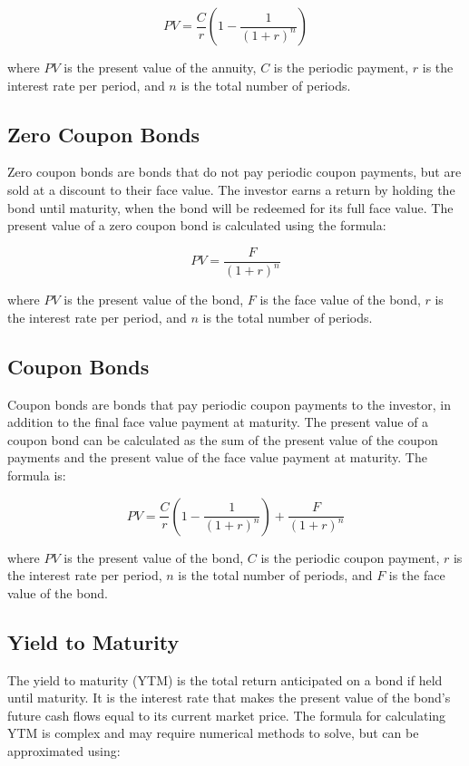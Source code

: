\documentclass{article}
\theoremstyle{mytheoremstyle}
\theoremstyle{mytheoremstyle}
\theoremstyle{myproblemstyle}
\begin{document}
\begin{equation}
PV = \frac{C}{r} \left( 1 - \frac{1}{(1+r)^n} \right)
\end{equation}

where $PV$ is the present value of the annuity, $C$ is the periodic payment, $r$ is the interest rate per period, and $n$ is the total number of periods.

\subsection{Zero Coupon Bonds}
Zero coupon bonds are bonds that do not pay periodic coupon payments, but are sold at a discount to their face value. The investor earns a return by holding the bond until maturity, when the bond will be redeemed for its full face value. The present value of a zero coupon bond is calculated using the formula:

\begin{equation}
PV = \frac{F}{(1+r)^n}
\end{equation}

where $PV$ is the present value of the bond, $F$ is the face value of the bond, $r$ is the interest rate per period, and $n$ is the total number of periods.

\subsection{Coupon Bonds}
Coupon bonds are bonds that pay periodic coupon payments to the investor, in addition to the final face value payment at maturity. The present value of a coupon bond can be calculated as the sum of the present value of the coupon payments and the present value of the face value payment at maturity. The formula is:

\begin{equation}
PV = \frac{C}{r} \left( 1 - \frac{1}{(1+r)^n} \right) + \frac{F}{(1+r)^n}
\end{equation}

where $PV$ is the present value of the bond, $C$ is the periodic coupon payment, $r$ is the interest rate per period, $n$ is the total number of periods, and $F$ is the face value of the bond.

\subsection{Yield to Maturity}
The yield to maturity (YTM) is the total return anticipated on a bond if held until maturity. It is the interest rate that makes the present value of the bond's future cash flows equal to its current market price. The formula for calculating YTM is complex and may require numerical methods to solve, but can be approximated using:
\end{document}
